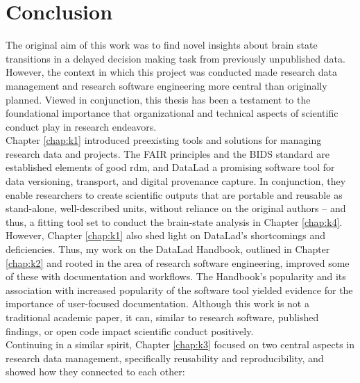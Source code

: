 

\chapter{Conclusion}
\label{discussion}

The original aim of this work was to find novel insights about brain state transitions in a delayed decision making task from previously unpublished data.
However, the context in which this project was conducted made research data management and research software engineering more central than originally planned.
Viewed in conjunction, this thesis has been a testament to the foundational importance that organizational and technical aspects of scientific conduct play in research endeavors.\\
Chapter \ref{chap:k1} introduced preexisting tools and solutions for managing research data and projects.
The \gls{FAIR} principles and the \gls{BIDS} standard are established elements of good \gls{rdm}, and DataLad a promising software tool for data versioning, transport, and digital provenance capture.
In conjunction, they enable researchers to create scientific outputs that are portable and reusable as stand-alone, well-described units, without reliance on the original authors -- and thus, a fitting tool set to conduct the brain-state analysis in Chapter \ref{chap:k4}.\\
However, Chapter \ref{chap:k1} also shed light on DataLad's shortcomings and deficiencies.
Thus, my work on the DataLad Handbook, outlined in Chapter \ref{chap:k2} and rooted in the area of research software engineering, improved some of these with documentation and workflows.
The Handbook's popularity and its association with increased popularity of the software tool yielded evidence for the importance of user-focused documentation.
Although this work is not a traditional academic paper, it can, similar to research software, published findings, or open code impact scientific conduct positively.\\
Continuing in a similar spirit, Chapter \ref{chap:k3} focused on two central aspects in research data management, specifically reusability and reproducibility, and showed how they connected to each other:
